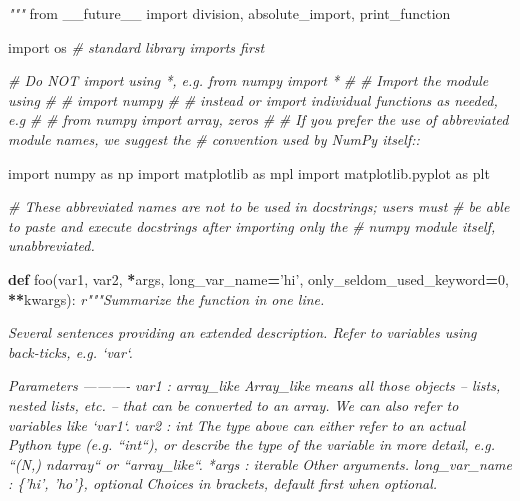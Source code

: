 \documentclass[
]{book}
\newenvironment{Shaded}{\begin{snugshade}}{\end{snugshade}}
\newcommand{\CommentTok}[1]{\textcolor[rgb]{0.56,0.35,0.01}{\textit{#1}}}
\newcommand{\DecValTok}[1]{\textcolor[rgb]{0.00,0.00,0.81}{#1}}
\newcommand{\ImportTok}[1]{#1}
\newcommand{\KeywordTok}[1]{\textcolor[rgb]{0.13,0.29,0.53}{\textbf{#1}}}
\newcommand{\NormalTok}[1]{#1}
\newcommand{\OperatorTok}[1]{\textcolor[rgb]{0.81,0.36,0.00}{\textbf{#1}}}
\newcommand{\StringTok}[1]{\textcolor[rgb]{0.31,0.60,0.02}{#1}}
\begin{document}
\begin{itemize}
\begin{Shaded}
\begin{Highlighting}[]
\CommentTok{"""}
\ImportTok{from}\NormalTok{ __future__ }\ImportTok{import}\NormalTok{ division, absolute_import, print_function}

\ImportTok{import}\NormalTok{ os  }\CommentTok{# standard library imports first}

\CommentTok{# Do NOT import using *, e.g. from numpy import *}
\CommentTok{#}
\CommentTok{# Import the module using}
\CommentTok{#}
\CommentTok{#   import numpy}
\CommentTok{#}
\CommentTok{# instead or import individual functions as needed, e.g}
\CommentTok{#}
\CommentTok{#  from numpy import array, zeros}
\CommentTok{#}
\CommentTok{# If you prefer the use of abbreviated module names, we suggest the}
\CommentTok{# convention used by NumPy itself::}

\ImportTok{import}\NormalTok{ numpy }\ImportTok{as}\NormalTok{ np}
\ImportTok{import}\NormalTok{ matplotlib }\ImportTok{as}\NormalTok{ mpl}
\ImportTok{import}\NormalTok{ matplotlib.pyplot }\ImportTok{as}\NormalTok{ plt}

\CommentTok{# These abbreviated names are not to be used in docstrings; users must}
\CommentTok{# be able to paste and execute docstrings after importing only the}
\CommentTok{# numpy module itself, unabbreviated.}


\KeywordTok{def}\NormalTok{ foo(var1, var2, }\OperatorTok{*}\NormalTok{args, long_var_name}\OperatorTok{=}\StringTok{'hi'}\NormalTok{, only_seldom_used_keyword}\OperatorTok{=}\DecValTok{0}\NormalTok{, }\OperatorTok{**}\NormalTok{kwargs):}
    \CommentTok{r"""Summarize the function in one line.}

\CommentTok{    Several sentences providing an extended description. Refer to}
\CommentTok{    variables using back-ticks, e.g. `var`.}

\CommentTok{    Parameters}
\CommentTok{    ----------}
\CommentTok{    var1 : array_like}
\CommentTok{        Array_like means all those objects -- lists, nested lists, etc. --}
\CommentTok{        that can be converted to an array.  We can also refer to}
\CommentTok{        variables like `var1`.}
\CommentTok{    var2 : int}
\CommentTok{        The type above can either refer to an actual Python type}
\CommentTok{        (e.g. ``int``), or describe the type of the variable in more}
\CommentTok{        detail, e.g. ``(N,) ndarray`` or ``array_like``.}
\CommentTok{    *args : iterable}
\CommentTok{        Other arguments.}
\CommentTok{    long_var_name : \{'hi', 'ho'\}, optional}
\CommentTok{        Choices in brackets, default first when optional.}


\end{Highlighting}
\end{Shaded}
\end{itemize}
\end{document}
